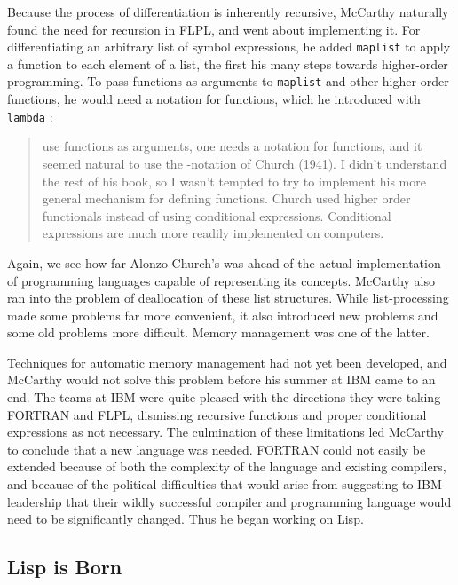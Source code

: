 Because the process of differentiation is inherently recursive, McCarthy naturally
found the need for recursion in FLPL, and went about implementing it.
For differentiating an arbitrary list of symbol expressions,
he added \texttt{maplist} to apply a function to each element of a list,
the first his many steps towards higher-order programming.
To pass functions as arguments to \texttt{maplist} and other higher-order functions,
he would need a notation for functions, which he introduced with \texttt{lambda}
\cite{mccarthy_history_of_lisp_1978}:

\begin{quotation}
	use functions as arguments, one needs a notation for functions, and it seemed
	natural to use the \textlambda-notation of Church (1941).
	I didn't understand the rest of his book, so I
	wasn't tempted to try to implement his more general mechanism for defining functions.
	Church used higher order functionals instead of using conditional expressions.
	Conditional expressions are much more readily implemented on computers.
\end{quotation}

Again, we see how far Alonzo Church's \lambdacalc was ahead of the actual
implementation of programming languages capable of representing its concepts.
McCarthy also ran into the problem of deallocation of these list structures.
While list-processing made some problems far more convenient,
it also introduced new problems and some old problems more difficult.
Memory management was one of the latter.

Techniques for automatic memory management had not yet been developed,
and McCarthy would not solve this problem before his summer at IBM
came to an end.
The teams at IBM were quite pleased with the directions they were taking
FORTRAN and FLPL, dismissing recursive functions and
proper conditional expressions as not necessary.
The culmination of these limitations led
McCarthy to conclude that a new language was needed.
FORTRAN could not easily be extended because of both the complexity of the language
and existing compilers, and because of the political difficulties that
would arise from suggesting to IBM leadership that their wildly successful compiler
and programming language would need to be significantly changed.
Thus he began working on Lisp.

\subsection{Lisp is Born}

